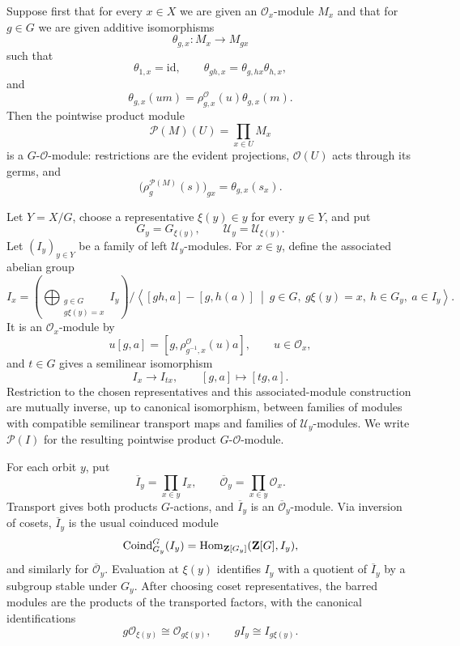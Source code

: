 \begin{definition}
\label{definition-equivariant-product-module}
\begin{reference}
\cite[Chapter V, \S 5.1, p. 197]{Tohoku}
\end{reference}
Suppose first that for every $x\in X$ we are given an
$\mathcal{O}_x$-module $M_x$ and that for $g\in G$ we are given additive
isomorphisms
$$
\theta_{g,x}:M_x\longrightarrow M_{gx}
$$
such that
$$
\theta_{1,x}=\text{id},
\qquad
\theta_{gh,x}=\theta_{g,hx}\theta_{h,x},
$$
and
$$
\theta_{g,x}(um)=\rho^\mathcal{O}_{g,x}(u)\theta_{g,x}(m).
$$
Then the pointwise product module
$$
\mathcal{P}(M)(U)=\prod_{x\in U}M_x
$$
is a $G$-$\mathcal{O}$-module: restrictions are the evident projections,
$\mathcal{O}(U)$ acts through its germs, and
$$
\bigl(\rho_g^{\mathcal{P}(M)}(s)\bigr)_{gx}
=\theta_{g,x}(s_x).
$$

Let $Y=X/G$, choose a representative $\xi(y)\in y$ for every
$y\in Y$, and put
$$
G_y=G_{\xi(y)},
\qquad
\mathcal{U}_y=\mathcal{U}_{\xi(y)}.
$$
Let $(I_y)_{y\in Y}$ be a family of left $\mathcal{U}_y$-modules.
For $x\in y$, define the associated abelian group
$$
I_x=
\left(
\bigoplus_{\substack{g\in G\\g\xi(y)=x}} I_y
\right)
\big/
\left\langle
[gh,a]-[g,h(a)]
\ \middle|\
g\in G,\ g\xi(y)=x,\ h\in G_y,\ a\in I_y
\right\rangle .
$$
It is an $\mathcal{O}_x$-module by
$$
u[g,a]
=
[g,\rho^\mathcal{O}_{g^{-1},x}(u)a],
\qquad
u\in\mathcal{O}_x,
$$
and $t\in G$ gives a semilinear isomorphism
$$
I_x\longrightarrow I_{tx},
\qquad
[g,a]\longmapsto[tg,a].
$$
Restriction to the chosen representatives and this associated-module
construction are mutually inverse, up to canonical isomorphism, between
families of modules with compatible semilinear transport maps and families
of $\mathcal{U}_y$-modules. We write $\mathcal{P}(I)$ for the resulting
pointwise product $G$-$\mathcal{O}$-module.

For each orbit $y$, put
$$
\overline I_y=\prod_{x\in y}I_x,
\qquad
\overline{\mathcal O}_y=\prod_{x\in y}\mathcal O_x.
$$
Transport gives both products $G$-actions, and
$\overline I_y$ is an $\overline{\mathcal O}_y$-module. Via inversion of
cosets, $\overline I_y$ is the usual coinduced module
$$
\operatorname{Coind}_{G_y}^G(I_y)
=
\mathop{\mathrm{Hom}}\nolimits_{\mathbf Z[G_y]}(\mathbf Z[G],I_y),
$$
and similarly for $\overline{\mathcal O}_y$. Evaluation at $\xi(y)$
identifies $I_y$ with a quotient of $\overline I_y$ by a subgroup stable
under $G_y$. After choosing coset representatives, the barred modules are
the products of the transported factors, with the canonical identifications
$$
g\mathcal O_{\xi(y)}\cong\mathcal O_{g\xi(y)},
\qquad
gI_y\cong I_{g\xi(y)}.
$$
\end{definition}

